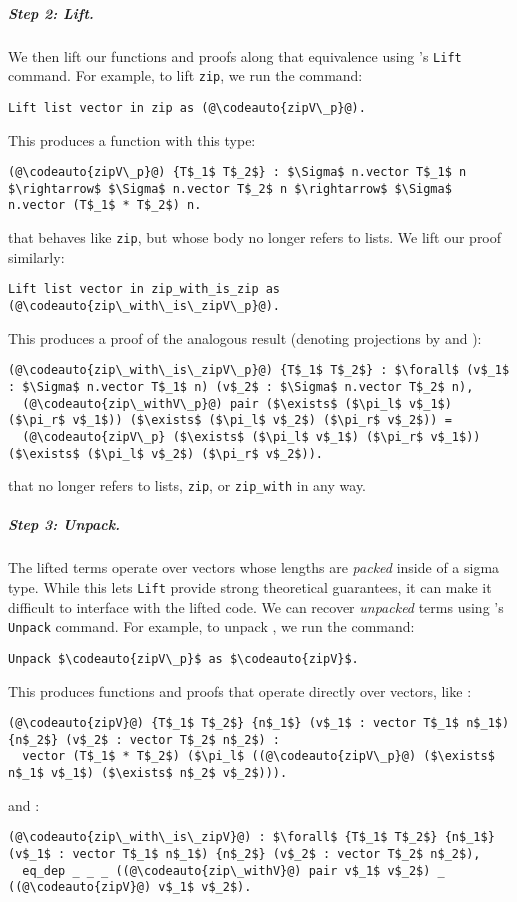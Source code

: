 \subparagraph*{Step 2: Lift.}
We then lift our functions and proofs
along that equivalence using \toolnameb's \lstinline{Lift} command.
For example, to lift \lstinline{zip}, we run the command:
\begin{lstlisting}
Lift list vector in zip as (@\codeauto{zipV\_p}@).
\end{lstlisting}
This produces a function with this type:
\begin{lstlisting}
(@\codeauto{zipV\_p}@) {T$_1$ T$_2$} : $\Sigma$ n.vector T$_1$ n $\rightarrow$ $\Sigma$ n.vector T$_2$ n $\rightarrow$ $\Sigma$ n.vector (T$_1$ * T$_2$) n.
\end{lstlisting}
that behaves like \lstinline{zip}, but whose body no longer refers to lists.
We lift our proof similarly:
\begin{lstlisting}
Lift list vector in zip_with_is_zip as (@\codeauto{zip\_with\_is\_zipV\_p}@).
\end{lstlisting}
This produces a proof of the analogous result (denoting projections by  and ):
\begin{lstlisting}
(@\codeauto{zip\_with\_is\_zipV\_p}@) {T$_1$ T$_2$} : $\forall$ (v$_1$ : $\Sigma$ n.vector T$_1$ n) (v$_2$ : $\Sigma$ n.vector T$_2$ n),
  (@\codeauto{zip\_withV\_p}@) pair ($\exists$ ($\pi_l$ v$_1$) ($\pi_r$ v$_1$)) ($\exists$ ($\pi_l$ v$_2$) ($\pi_r$ v$_2$)) =
  (@\codeauto{zipV\_p} ($\exists$ ($\pi_l$ v$_1$) ($\pi_r$ v$_1$)) ($\exists$ ($\pi_l$ v$_2$) ($\pi_r$ v$_2$)).
\end{lstlisting}
that no longer refers to lists, \lstinline{zip}, or \lstinline{zip_with} in any way.

\subparagraph*{Step 3: Unpack.}
The lifted terms operate over vectors whose lengths are \textit{packed} inside of a sigma type.
While this lets \lstinline{Lift} provide strong theoretical guarantees, it can make it difficult to interface with the lifted code.
We can recover \textit{unpacked} terms using \toolnameb's \lstinline{Unpack} command.
For example, to unpack , we run the command:
\begin{lstlisting}
Unpack $\codeauto{zipV\_p}$ as $\codeauto{zipV}$.
\end{lstlisting}
This produces functions and proofs that operate directly over vectors, like :
\begin{lstlisting}
(@\codeauto{zipV}@) {T$_1$ T$_2$} {n$_1$} (v$_1$ : vector T$_1$ n$_1$) {n$_2$} (v$_2$ : vector T$_2$ n$_2$) : 
  vector (T$_1$ * T$_2$) ($\pi_l$ ((@\codeauto{zipV\_p}@) ($\exists$ n$_1$ v$_1$) ($\exists$ n$_2$ v$_2$))).
\end{lstlisting}
and :
\begin{lstlisting}
(@\codeauto{zip\_with\_is\_zipV}@) : $\forall$ {T$_1$ T$_2$} {n$_1$} (v$_1$ : vector T$_1$ n$_1$) {n$_2$} (v$_2$ : vector T$_2$ n$_2$),
  eq_dep _ _ _ ((@\codeauto{zip\_withV}@) pair v$_1$ v$_2$) _ ((@\codeauto{zipV}@) v$_1$ v$_2$).
\end{lstlisting}

